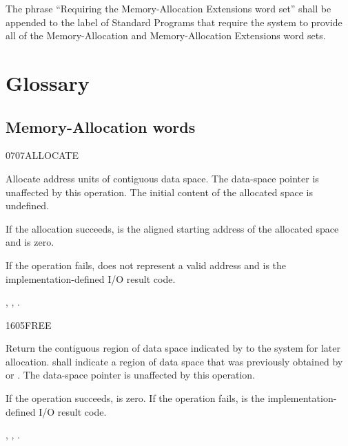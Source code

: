 The phrase ``Requiring the Memory-Allocation Extensions word set''
shall be appended to the label of Standard Programs that require
the system to provide all of the Memory-Allocation and
Memory-Allocation Extensions word sets.


\section{Glossary} %

\subsection{Memory-Allocation words} %


\begin{worddef}{0707}{ALLOCATE}
\item {}

	Allocate  address units of contiguous data space. The
	data-space pointer is unaffected by this operation. The initial
	content of the allocated space is undefined.

	If the allocation succeeds,  is the aligned
	starting address of the allocated space and  is
	zero.

	If the operation fails,  does not represent a valid
	address and  is the implementation-defined I/O result
	code.

\see {},
	,
	.
\end{worddef}


\begin{worddef}{1605}{FREE}
\item {}

	Return the contiguous region of data space indicated by
	 to the system for later allocation. 
	shall indicate a region of data space that was previously
	obtained by  or . The data-space
	pointer is unaffected by this operation.

	If the operation succeeds,  is zero. If the operation
	fails,  is the implementation-defined I/O result code.

\see {},
	,
	.
\end{worddef}



